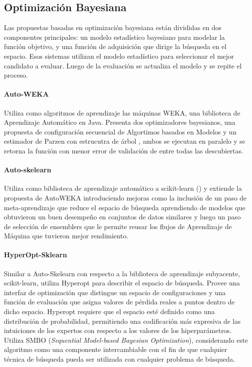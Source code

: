 \subsection{Optimizaci\'on Bayesiana}
Las propuestas basadas en optimizaci\'on bayesiana est\'an divididas en dos componentes principales: un modelo estad\'istico bayesiano para modelar la funci\'on objetivo, y una funci\'on de adquisici\'on que dirige la b\'usqueda en el espacio. Esos sistemas utilizan el modelo estad\'istico para seleccionar el mejor candidato a evaluar. Luego de la evaluaci\'on se actualiza el modelo y se repite el proceso.

\paragraph{Auto-WEKA } Utiliza como algoritmos de aprendizaje las m\'aquinas WEKA, una biblioteca de Aprendizaje Autom\'atico en Java. Presenta dos optimizadores bayesianos, una propuesta de configuraci\'on secuencial de Algortimos basados en Modelos   y un estimador de Parzen con estrucutra de \'arbol , ambos se ejecutan en paralelo y se retorna la funci\'on con menor error de validaci\'on de entre todas las descubiertas.

\paragraph*{Auto-skelearn } Utiliza como biblioteca de aprendizaje autom\'atico a scikit-learn () y extiende la propuesta de AutoWEKA  introduciendo mejoras como la inclusi\'on de un paso de meta-aprendizaje que reduce el espacio de b\'usqueda aprendiendo de modelos que obtuvieron un buen desempe\~no en conjuntos de datos similares y luego un paso de selecci\'on de ensemblers que le permite reusar los flujos de Aprendizaje de M\'aquina que tuvieron mejor rendimiento. 

\paragraph*{HyperOpt-Sklearn } Similar a Auto-Skelearn con respecto a la biblioteca de aprendizaje subyacente, scikit-learn, utiliza Hyperopt  para describir el espacio de b\'usqueda. Provee una interfaz de optimizaci\'on que distingue un espacio de configuraciones y una funci\'on de evaluaci\'on que asigna valores de p\'erdida reales a puntos dentro de dicho espacio. Hyperopt requiere que el espacio est\'e definido como una distribuci\'on de probabilidad, permitiendo una codificaci\'on m\'as expresiva de las intuiciones de los expertos con respecto a los valores de los hiperpar\'ametros. Utiliza SMBO (\textit{Sequential Model-based Bayesian Optimization}), considerando este algoritmo como una componente intercambiable con el fin de que cualquier t\'ecnica de b\'usqueda pueda ser utilizada con cualquier problema de b\'usqueda.

